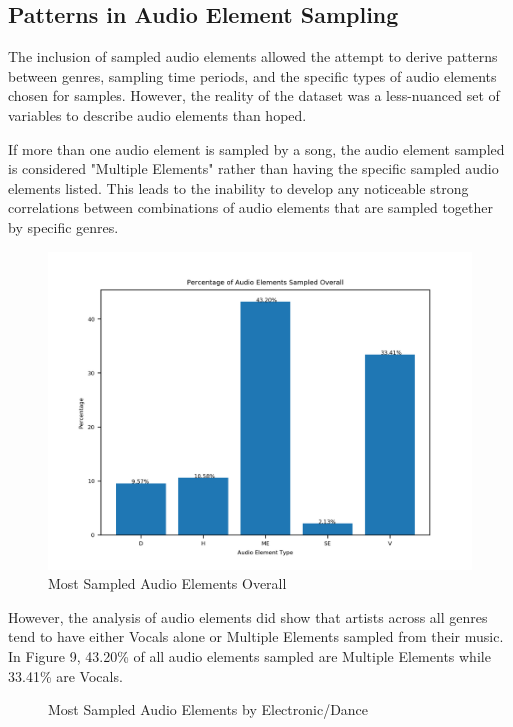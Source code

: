 \documentclass[pageno]{jpaper}
\begin{document}
\subsection{Patterns in Audio Element Sampling}
The inclusion of sampled audio elements allowed the attempt to derive patterns between genres, sampling time periods, and the specific types of audio elements chosen for samples. However, the reality of the dataset was a less-nuanced set of variables to describe audio elements than hoped.

If more than one audio element is sampled by a song, the audio element sampled is considered "Multiple Elements" rather than having the specific sampled audio elements listed. This leads to the inability to develop any noticeable strong correlations between combinations of audio elements that are sampled together by specific genres.
\begin{figure}[H]
\includegraphics{audioElemSampledOverall}
\caption{Most Sampled Audio Elements Overall}
\label{fig:fig9}
\centering
\end{figure}
However, the analysis of audio elements did show that artists across all genres tend to have either Vocals alone or Multiple Elements sampled from their music. In Figure 9, 43.20\% of all audio elements sampled are Multiple Elements while 33.41\% are Vocals. 
\begin{figure}[H]
\centering
\caption{Most Sampled Audio Elements by Hip-Hop/R\&B}\caption{Most Sampled Audio Elements by Electronic/Dance}
\label{fig:fig10}
\label{fig:fig11}
\end{figure}
\end{document}

